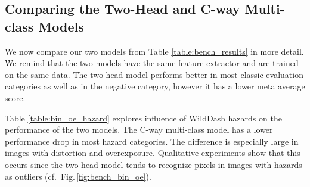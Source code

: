 \documentclass[runningheads]{llncs}
\begin{document}
\subsection{Comparing the Two-Head and 
  C-way Multi-class Models}
\label{ss:comparison}

We now compare our two models
from Table \ref{table:bench_results}
in more detail.
We remind that the two models 
have the same feature extractor
and are trained on the same data.
The two-head model performs better 
in most classic evaluation categories 
as well as in the negative category, 
however it has a lower meta average score.

\begin{comment}
\begin{table}[htb]
\centering
\caption{Performance of the bin and oe model
    on wilddash bench}
\label{table:bin_oe}
\begin{tabular}{|c||c|cccc|c|}
  \hline
  & \multicolumn{1}{c|}{Meta Avg}  
  & \multicolumn{4}{c|}{Classic} 
  & \multicolumn{1}{c|}{Negative}
\\
  \cline{2-7}
  Model
  & mIoU
  & mIoU
  & iIoU
  & mIoU
  & iIoU
  & mIoU
\\
 &cla &cla&cla &cat&cat&cla\\
 \hline
 \hline
  \multicolumn{1}{|l||}{two head} & 41.8 & \textbf{43.8} & \textbf{37.3} & 58.6 & \textbf{53.3} & \textbf{54.3}\\
  \hline
  \multicolumn{1}{|l||}{oe} & \textbf{42.7} & 43.3 & 31.9 & \textbf{60.7} & 50.3 & 52.8\\
\hline
\end{tabular}
\end{table}
\end{comment}

Table \ref{table:bin_oe_hazard} explores 
influence of WildDash hazards
\cite{zendel18eccv}
on the performance of the two models. 
The C-way multi-class model
has a lower performance drop 
in most hazard categories. 
The difference is especially large
in images with distortion and overexposure. 
Qualitative experiments show 
that this occurs since 
the two-head model tends 
to recognize pixels in 
images with hazards as outliers
(cf.\ Fig.\,\ref{fig:bench_bin_oe}).
\end{document}

